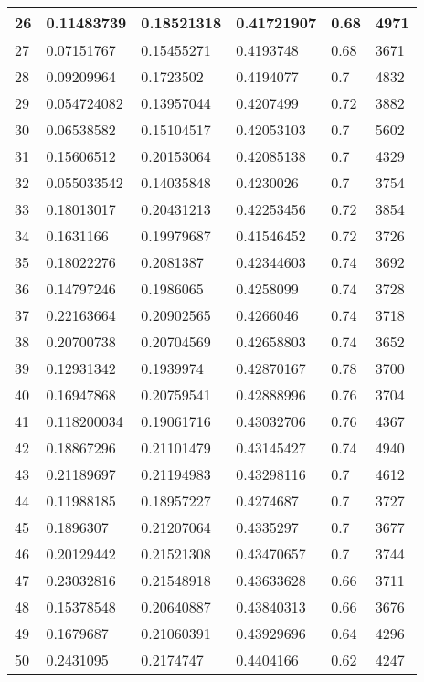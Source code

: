 \begin{longtable}{|l|l|l|l|l|l|}
26 & 0.11483739 & 0.18521318 & 0.41721907 & 0.68 & 4971 \\ \hline 
27 & 0.07151767 & 0.15455271 & 0.4193748 & 0.68 & 3671 \\ \hline 
28 & 0.09209964 & 0.1723502 & 0.4194077 & 0.7 & 4832 \\ \hline 
29 & 0.054724082 & 0.13957044 & 0.4207499 & 0.72 & 3882 \\ \hline 
30 & 0.06538582 & 0.15104517 & 0.42053103 & 0.7 & 5602 \\ \hline 
31 & 0.15606512 & 0.20153064 & 0.42085138 & 0.7 & 4329 \\ \hline 
32 & 0.055033542 & 0.14035848 & 0.4230026 & 0.7 & 3754 \\ \hline 
33 & 0.18013017 & 0.20431213 & 0.42253456 & 0.72 & 3854 \\ \hline 
34 & 0.1631166 & 0.19979687 & 0.41546452 & 0.72 & 3726 \\ \hline 
35 & 0.18022276 & 0.2081387 & 0.42344603 & 0.74 & 3692 \\ \hline 
36 & 0.14797246 & 0.1986065 & 0.4258099 & 0.74 & 3728 \\ \hline 
37 & 0.22163664 & 0.20902565 & 0.4266046 & 0.74 & 3718 \\ \hline 
38 & 0.20700738 & 0.20704569 & 0.42658803 & 0.74 & 3652 \\ \hline 
39 & 0.12931342 & 0.1939974 & 0.42870167 & 0.78 & 3700 \\ \hline 
40 & 0.16947868 & 0.20759541 & 0.42888996 & 0.76 & 3704 \\ \hline 
41 & 0.118200034 & 0.19061716 & 0.43032706 & 0.76 & 4367 \\ \hline 
42 & 0.18867296 & 0.21101479 & 0.43145427 & 0.74 & 4940 \\ \hline 
43 & 0.21189697 & 0.21194983 & 0.43298116 & 0.7 & 4612 \\ \hline 
44 & 0.11988185 & 0.18957227 & 0.4274687 & 0.7 & 3727 \\ \hline 
45 & 0.1896307 & 0.21207064 & 0.4335297 & 0.7 & 3677 \\ \hline 
46 & 0.20129442 & 0.21521308 & 0.43470657 & 0.7 & 3744 \\ \hline 
47 & 0.23032816 & 0.21548918 & 0.43633628 & 0.66 & 3711 \\ \hline 
48 & 0.15378548 & 0.20640887 & 0.43840313 & 0.66 & 3676 \\ \hline 
49 & 0.1679687 & 0.21060391 & 0.43929696 & 0.64 & 4296 \\ \hline 
50 & 0.2431095 & 0.2174747 & 0.4404166 & 0.62 & 4247 \\ \hline 
\end{longtable}